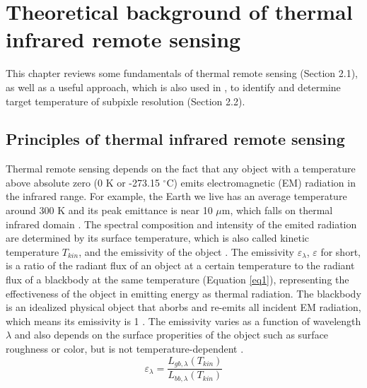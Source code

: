 \chapter{Theoretical background of thermal infrared remote sensing}

\label{Chapter2}

This chapter reviews some fundamentals of thermal remote sensing (Section 2.1), as well as a useful approach, which is also used in , to identify and determine target temperature of subpixle resolution (Section 2.2). \\


\section{Principles of thermal infrared remote sensing}
Thermal remote sensing depends on the fact that any object with a temperature above absolute zero (0 K or -273.15 $^\circ$C) emits electromagnetic (EM) radiation in the infrared range. For example, the Earth we live has an average temperature around 300 K and its peak emittance is near 10 $\mu$m, which falls on thermal infrared domain \parencite {Reference201, Reference202}. The spectral composition and intensity of the emited radiation are determined by its surface temperature, which is also called kinetic temperature $T_{kin}$,  and the emissivity of the object \parencite{Reference207}. The emissivity $\varepsilon_{\lambda}$, $\varepsilon$ for short, is a ratio of the radiant flux of an object at a certain temperature to the radiant flux of a blackbody at the same temperature (Equation \eqref{eq1}), representing the effectiveness of the object in emitting energy as thermal radiation. The blackbody is an idealized physical object that aborbs and re-emits all incident EM radiation, which means its emissivity is 1 \parencite{Reference206, Reference204}. The emissivity varies as a function of wavelength $\lambda$ and also depends on the surface properities of the object such as surface roughness or color, but is not temperature-dependent \parencite{Reference203}.\\
\begin{equation}
\label{eq1}
\varepsilon_{\lambda} = \frac{L_{gb, \lambda}(T_{kin})}{L_{bb, \lambda}(T_{kin})}
\end{equation}

